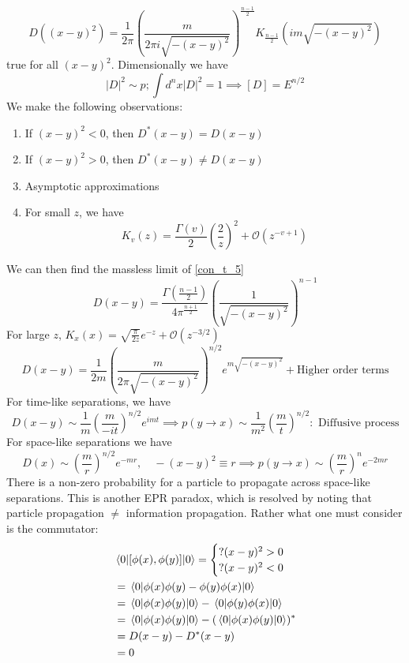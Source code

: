 \begin{equation}\label{con_t_5}
     D( (x - y)^2) = \frac{1}{2\pi} \left( \frac{m}{2 \pi i \sqrt{-(x - y)^2} } \right)^{\frac{n-1}{2}} K_{\frac{n-1}{2}} (i m \sqrt{-(x - y)^2} )
\end{equation}
true for all $(x - y)^2$. Dimensionally we have $$|D|^2 \sim p; \int d^n x |D|^2 = 1 \implies [D] = E^{n/2}$$
We make the following observations:
\begin{enumerate}
    \item If $(x - y)^2 < 0$, then $D^*(x - y) = D(x - y)$
    \item If $(x - y)^2 > 0$, then $D^*(x - y) \neq D(x - y)$
    \item Asymptotic approximations
    \item For small $z$, we have $$K_v (z) = \frac{\Gamma (v) }{2} \left(  \frac{2}{z} \right)^2 + \mathcal{O} (z^{-v+1}) $$
\end{enumerate}
We can then find the massless limit of \eqref{con_t_5}
\begin{equation}\label{con_t_4}
     D( x - y) = \frac{\Gamma \left( \frac{n-1}{2}  \right) }{4\pi^{\frac{n+1}{2}}} \left( \frac{1}{ \sqrt{-(x - y)^2} } \right)^{n-1} 
\end{equation}
For large $z$, $K_x(x) = \sqrt{\frac{\pi}{2z}} e^{-z} + \mathcal{O} (z^{-3/2}) $
\begin{equation}\label{con_t_4}
     D( x - y) = \frac{1 }{2m} \left( \frac{m}{ 2\pi\sqrt{-(x - y)^2} } \right)^{n/2} e^{m\sqrt{-(x - y)^2}} + \text{Higher order terms} 
\end{equation}
For time-like separations, we have 
\begin{equation}
    D(x - y) \sim \frac{1}{m} \left(   \frac{m}{-it}\right)^{n/2} e^{imt} \implies p(y \to x) \sim \frac{1}{m^2} \left(  \frac{m}{t}  \right)^{n/2} : \text{ Diffusive process}
\end{equation}
For space-like separations we have 
\begin{equation}
    D(x ) \sim  \left(   \frac{m}{r}\right)^{n/2} e^{-mr} , \quad -(x - y)^2 \equiv r \implies p(y \to x) \sim  \left(  \frac{m}{r}  \right)^{n}e^{-2mr} 
\end{equation}
There is a non-zero probability for a particle to propagate across space-like separations. This is another EPR paradox, which is resolved by noting that particle propagation $\neq $ information propagation. Rather what one must consider is the commutator:
\begin{align}
    & \mel{0}{\comm{\phi(x)}{\phi(y)}}{0} = \begin{cases}
               ?  (x - y)^2 > 0 \\
               ? (x - y)^2 < 0
    \end{cases} \nonumber\\
    & = \mel{0}{\phi(x) \phi(y) -  \phi(y) \phi(x)}{0} \nonumber\\
    & = \mel{0}{\phi(x) \phi(y) }{0} - \mel{0}{\phi(y) \phi(x) }{0} \nonumber\\
    & = \mel{0}{\phi(x) \phi(y) }{0} - (\mel{0}{\phi(x) \phi(y) }{0})^* \nonumber\\
    & = D(x - y) - D^*(x - y) \nonumber\\
    & = 0 
\end{align}
